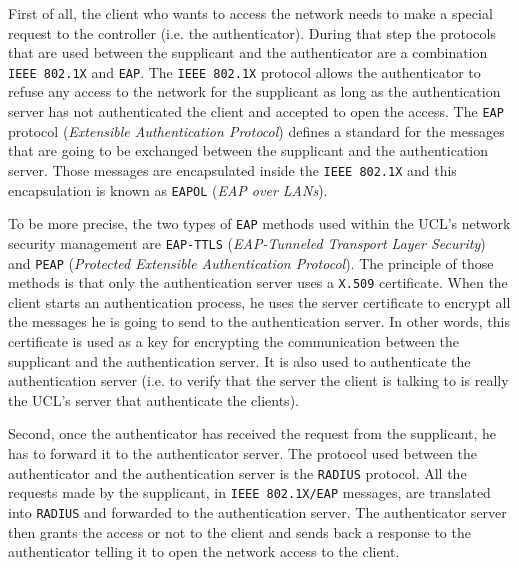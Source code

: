 First of all, the client who wants to access the network needs to make a special request to the controller (i.e. the authenticator). During that step the protocols that are used between the supplicant and the authenticator are a combination \texttt{IEEE 802.1X} and \texttt{EAP}. The \texttt{IEEE 802.1X} protocol allows the authenticator to refuse any access to the network for the supplicant as long as the authentication server has not authenticated the client and accepted to open the access. The \texttt{EAP} protocol (\textit{Extensible Authentication Protocol}) defines a standard for the messages that are going to be exchanged between the supplicant and the authentication server. Those messages are encapsulated inside the \texttt{IEEE 802.1X} and this encapsulation is known as \texttt{EAPOL} (\textit{EAP over LANs}).

To be more precise, the two types of \texttt{EAP} methods used within the UCL's network security management are \texttt{EAP-TTLS} (\textit{EAP-Tunneled Transport Layer Security}) and \texttt{PEAP} (\textit{Protected Extensible Authentication Protocol}). The principle of those methods is that only the authentication server uses a \texttt{X.509} certificate. When the client starts an authentication process, he uses the server certificate to encrypt all the messages he is going to send to the authentication server. In other words, this certificate is used as a key for encrypting the communication between the supplicant and the authentication server. It is also used to authenticate the authentication server (i.e. to verify that the server the client is talking to is really the UCL's server that authenticate the clients).


Second, once the authenticator has received the request from the supplicant, he has to forward it to the authenticator server. The protocol used between the authenticator and the authentication server is the \texttt{RADIUS} protocol. All the requests made by the supplicant, in \texttt{IEEE 802.1X/EAP} messages, are translated into \texttt{RADIUS} and forwarded to the authentication server. The authenticator server then grants the access or not to the client and sends back a response to the authenticator telling it to open the network access to the client.


